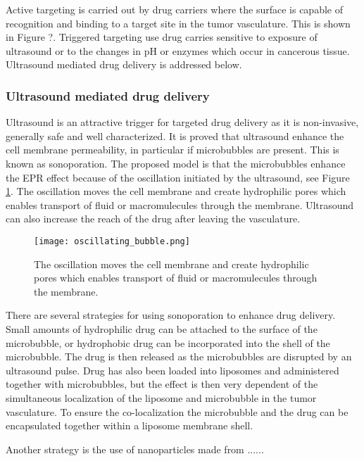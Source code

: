 Active targeting is carried out by drug carriers where the surface is capable of recognition and binding to a target site in the tumor vasculature. This is shown in Figure ?. Triggered targeting use drug carries sensitive to exposure of ultrasound or to the changes in pH or enzymes which occur in cancerous tissue. Ultrasound mediated drug delivery is addressed below.

\subsubsection{Ultrasound mediated drug delivery}
\label{sec:umdd}
Ultrasound is an attractive trigger for targeted drug delivery as it is non-invasive, generally safe and well characterized. It is proved that ultrasound enhance the cell membrane permeability, in particular if microbubbles are present\cite{VanWamel2006a}. This is known as sonoporation. The proposed model is that the microbubbles enhance the EPR effect because of the oscillation initiated by the ultrasound, see Figure \ref{Fig:oscillating_bubble}. The oscillation moves the cell membrane and create hydrophilic pores which enables transport of fluid or macromulecules through the membrane\cite{VanWamel2006a}. Ultrasound can also increase the reach of the drug after leaving the vasculature\cite{Eggen2013}.

\begin{figure}[h]
  \centering
  \label{Fig:oscillating_bubble}
  \texttt{[image: oscillating\_bubble.png]}
  \caption{The oscillation moves the cell membrane and create hydrophilic pores which enables transport of fluid or macromulecules through the membrane\cite{VanWamel2006a}.}
\end{figure}


There are several strategies for using sonoporation to enhance drug delivery. Small amounts of hydrophilic drug can be attached to the surface of the microbubble, or hydrophobic drug can be incorporated into the shell of the microbubble. The drug is then released as the microbubbles are disrupted by an ultrasound pulse\cite{Liu2006}. Drug has also been loaded into liposomes and administered together with microbubbles, but the effect is then very dependent of the simultaneous localization of the liposome and microbubble in the tumor vasculature. To ensure the co-localization the microbubble and the drug can be encapsulated together within a liposome membrane shell\cite{Ibsen2011}.

Another strategy is the use of nanoparticles made from ......

